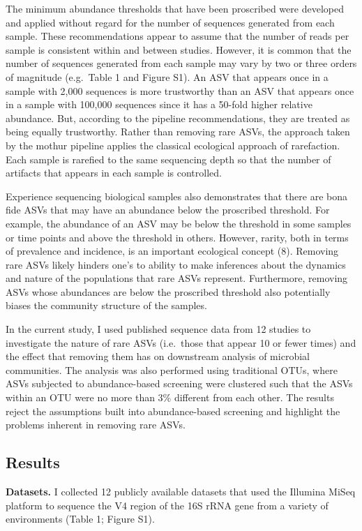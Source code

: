 \documentclass[
]{article}
\begin{document}
The minimum abundance thresholds that have been proscribed were
developed and applied without regard for the number of sequences
generated from each sample. These recommendations appear to assume that
the number of reads per sample is consistent within and between studies.
However, it is common that the number of sequences generated from each
sample may vary by two or three orders of magnitude (e.g.~Table 1 and
Figure S1). An ASV that appears once in a sample with 2,000 sequences is
more trustworthy than an ASV that appears once in a sample with 100,000
sequences since it has a 50-fold higher relative abundance. But,
according to the pipeline recommendations, they are treated as being
equally trustworthy. Rather than removing rare ASVs, the approach taken
by the mothur pipeline applies the classical ecological approach of
rarefaction. Each sample is rarefied to the same sequencing depth so
that the number of artifacts that appears in each sample is controlled.

Experience sequencing biological samples also demonstrates that there
are bona fide ASVs that may have an abundance below the proscribed
threshold. For example, the abundance of an ASV may be below the
threshold in some samples or time points and above the threshold in
others. However, rarity, both in terms of prevalence and incidence, is
an important ecological concept (8). Removing rare ASVs likely hinders
one's to ability to make inferences about the dynamics and nature of the
populations that rare ASVs represent. Furthermore, removing ASVs whose
abundances are below the proscribed threshold also potentially biases
the community structure of the samples.

In the current study, I used published sequence data from 12 studies to
investigate the nature of rare ASVs (i.e.~those that appear 10 or fewer
times) and the effect that removing them has on downstream analysis of
microbial communities. The analysis was also performed using traditional
OTUs, where ASVs subjected to abundance-based screening were clustered
such that the ASVs within an OTU were no more than 3\% different from
each other. The results reject the assumptions built into
abundance-based screening and highlight the problems inherent in
removing rare ASVs.

\hypertarget{results}{%
\subsection{Results}\label{results}}

\textbf{Datasets.} I collected 12 publicly available datasets that used
the Illumina MiSeq platform to sequence the V4 region of the 16S rRNA
gene from a variety of environments (Table 1; Figure S1).
\end{document}
